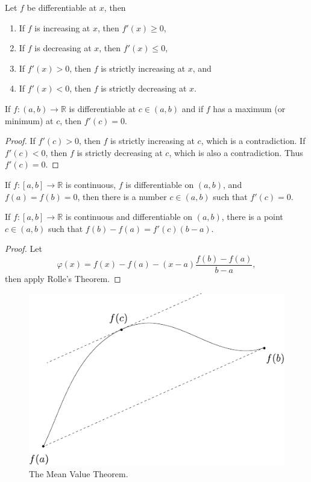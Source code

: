 \documentclass[twoside,10pt]{report}
\begin{document}
\begin{thrm}[]
Let $f$ be differentiable at $x$, then
\begin{enumerate}
	\item If $f$ is increasing at $x$, then $f'(x) \geq 0$,
	\item If $f$ is decreasing at $x$, then $f'(x) \leq 0$,
	\item If $f'(x) > 0$, then $f$ is strictly increasing at $x$, and
	\item If $f'(x) < 0$, then $f$ is strictly decreasing at $x$.
\end{enumerate}
\end{thrm}

\begin{prop}
	If $f:(a,b) \to \mathbb{R}$ is differentiable at $c \in (a,b)$ and if $f$ has a maximum (or minimum) at $c$, then $f'(c) = 0$.
\end{prop}
\begin{proof}
	If $f'(c) > 0$, then $f$ is strictly increasing at $c$, which is a contradiction. If $f'(c) < 0$, then $f$ is strictly decreasing at $c$, which is also a contradiction. Thus $f'(c)=0$.
\end{proof}

\begin{thrm}[Rolle's]
	If $f:[a,b] \to \mathbb{R}$ is continuous, $f$ is differentiable on $(a,b)$, and $f(a) = f(b) = 0$, then there is a number $c \in (a,b)$ such that $f'(c) = 0$.
\end{thrm}

\begin{thrm}
	If $f:[a,b] \to \mathbb{R}$ is continuous and differentiable on $(a,b)$, there is a point $c \in (a,b)$ such that $f(b) - f(a) = f'(c) (b-a)$.
\end{thrm}
\begin{proof}
	Let \[\varphi(x) = f(x)-f(a)-(x-a)\frac{f(b)-f(a)}{b-a}, \]
	then apply Rolle's Theorem.
\end{proof}

\begin{figure}[H]
	\centering
	\includegraphics[scale=0.7]{fig/mean-value.pdf}
	\caption{The Mean Value Theorem.}
\end{figure}
\end{document}
